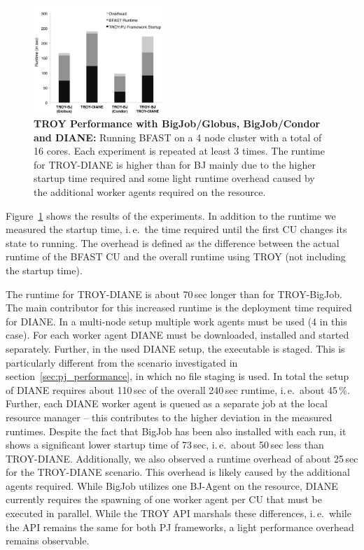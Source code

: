 \documentclass[conference,final]{IEEEtran}
\newcommand{\cu}{CU\xspace}
\newcommand{\up}{\vspace*{-1em}}
\begin{document}
\begin{figure}[t]
	\centering
		\includegraphics[width=0.45\textwidth]{figures/NewTROYData.pdf}
	\caption{\textbf{TROY Performance with BigJob/Globus, BigJob/Condor and 
	DIANE:} Running BFAST on a 4 node cluster with a total of 16 cores. Each 
	experiment is repeated at least 3 times. The runtime for TROY-DIANE is 
	higher than for BJ mainly due to the higher startup time required and some 
	light runtime overhead caused by the additional worker agents required on 
	the resource.\up\up}

	\label{fig:perf_perf-bfast-bj}
\end{figure}

Figure~\ref{fig:perf_perf-bfast-bj} shows the results of the experiments. In 
addition to the runtime we measured the startup time, i.\,e.\ the time required 
until the first \cu  changes its state to running. The overhead is defined as the 
difference between the actual runtime of the BFAST \cu  and the overall runtime 
using TROY (not including the startup time).

The runtime for TROY-DIANE is about 70\,sec longer than for TROY-BigJob. The 
main contributor for this increased runtime is the deployment time required for
DIANE. In a multi-node setup multiple work agents must be used (4 in this case).
For each worker agent DIANE must be downloaded, installed and started
separately. Further, in the used DIANE setup, the executable is staged. This is
particularly different from the scenario investigated in
section~\ref{sec:pj_performance}, in which no file staging is used. In total the
setup of DIANE requires about 110\,sec of the overall 240\,sec runtime, i.\,e.\
about 45\,\%. Further, each DIANE worker agent is queued as a separate job at
the local resource manager -- this contributes to the higher deviation in the
measured runtimes. Despite the fact that BigJob has been also installed with
each run, it shows a significant lower startup time of 73\,sec, i.\,e.\ about
50\,sec less than TROY-DIANE. Additionally, we also observed a runtime overhead
of about 25\,sec for the TROY-DIANE scenario. This overhead is likely caused by
the additional agents required. While BigJob utilizes one BJ-Agent on the 
resource, DIANE currently requires the spawning of one worker agent per \cu  that 
must be executed in parallel. While the TROY API marshals these differences, 
i.\,e.\ while the API remains the same for both PJ frameworks, a light 
performance overhead remains observable.
\end{document}

